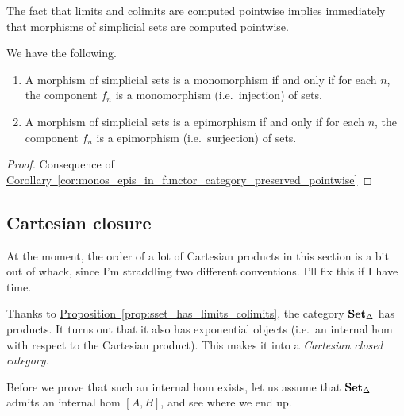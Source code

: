 \documentclass[main.tex]{subfiles}
\begin{document}
The fact that limits and colimits are computed pointwise implies immediately that morphisms of simplicial sets are computed pointwise.
\begin{lemma}
  \label{lemma:properties_of_morphisms_of_simplicial_sets}
  We have the following.
  \begin{enumerate}
    \item A morphism of simplicial sets is a monomorphism if and only if for each $n$, the component $f_{n}$ is a monomorphism (i.e.\ injection) of sets.

    \item A morphism of simplicial sets is a epimorphism if and only if for each $n$, the component $f_{n}$ is a epimorphism (i.e.\ surjection) of sets.
  \end{enumerate}
\end{lemma}
\begin{proof}
  Consequence of \hyperref[cor:monos_epis_in_functor_category_preserved_pointwise]{Corollary~\ref*{cor:monos_epis_in_functor_category_preserved_pointwise}}
\end{proof}

\subsection{Cartesian closure}
\label{ssc:cartesian_closure}

\begin{note}
  At the moment, the order of a lot of Cartesian products in this section is a bit out of whack, since I'm straddling two different conventions. I'll fix this if I have time.
\end{note}

Thanks to \hyperref[prop:sset_has_limits_colimits]{Proposition~\ref*{prop:sset_has_limits_colimits}}, the category $\operatorname{\mathbf{Set}_{\Delta}}$ has products. It turns out that it also has exponential objects (i.e.\ an internal hom with respect to the Cartesian product). This makes it into a \emph{Cartesian closed category.}

Before we prove that such an internal hom exists, let us assume that $\operatorname{\mathbf{Set}_{\Delta}}$ admits an internal hom $[A, B]$, and see where we end up. 
\end{document}
